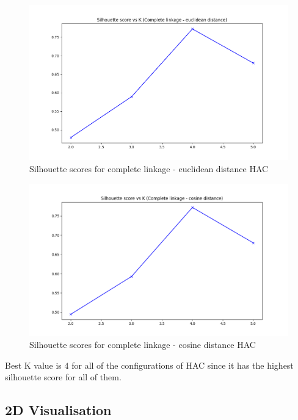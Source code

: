 \documentclass[12pt,a4paper, margin=1in]{article}
\begin{document}
\begin{figure}[H]
    \centering
    \includegraphics[scale=0.6]{complete_euclidean_silh.png}
    \caption{Silhouette scores for complete linkage - euclidean distance HAC}
\end{figure}

\begin{figure}[H]
    \centering
    \includegraphics[scale=0.6]{complete_cosine_silh.png}
    \caption{Silhouette scores for complete linkage - cosine distance HAC}
\end{figure}

Best K value is $4$ for all of the configurations of HAC since it has the highest silhouette score for all of them.

\subsection{2D Visualisation}
\end{document}
